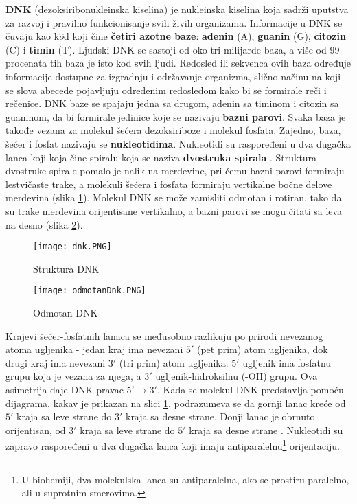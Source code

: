 \documentclass[12pt,oneside]{memoir}
\begin{document}
\textbf{DNK} (dezoksiribonukleinska kiselina) je nukleinska kiselina koja sadrži uputstva za razvoj i pravilno funkcionisanje svih živih organizama. Informacije u DNK se čuvaju kao k$\hat{o}$d koji čine \textbf{četiri azotne baze}: \textbf{adenin} (A), \textbf{guanin} (G), \textbf{citozin} (C) i \textbf{timin} (T). Ljudski DNK se sastoji od oko tri milijarde baza, a više od 99 procenata tih baza je isto kod svih ljudi. Redosled ili sekvenca ovih baza određuje informacije dostupne za izgradnju i održavanje organizma, slično načinu na koji se slova abecede pojavljuju određenim redosledom kako bi se formirale reči i rečenice. DNK baze se spajaju jedna sa drugom, adenin sa timinom i citozin sa guaninom, da bi formirale jedinice koje se nazivaju \textbf{bazni parovi}. Svaka baza je takođe vezana za molekul šećera dezoksiriboze i molekul fosfata. Zajedno, baza, šećer i fosfat nazivaju se \textbf{nukleotidima}. Nukleotidi su raspoređeni u dva dugačka lanca koji koja čine spiralu koja se naziva \textbf{dvostruka spirala} \cite{DNA}. Struktura dvostruke spirale pomalo je nalik na merdevine, pri čemu bazni parovi formiraju lestvičaste trake, a molekuli šećera i fosfata formiraju vertikalne bočne delove merdevina (slika \ref{fig:00}). Molekul DNK se može zamisliti odmotan i rotiran, tako da su trake merdevina orijentisane vertikalno, a bazni parovi se mogu čitati sa leva na desno (slika \ref{fig:odmotanDnk}).

\begin{figure}[!ht]
  \centering
  \texttt{[image: dnk.PNG]}
  \caption{Struktura DNK \cite{DNA}}
  \label{fig:00}
\end{figure}

\begin{figure}[!ht]
  \centering
  \texttt{[image: odmotanDnk.PNG]}
  \caption{Odmotan DNK \cite{DNA2}}
  \label{fig:odmotanDnk}
\end{figure}

Krajevi šećer-fosfatnih lanaca se međusobno razlikuju po prirodi nevezanog atoma ugljenika - jedan kraj ima nevezani $5'$ (pet prim) atom ugljenika, dok drugi kraj ima nevezani $3'$ (tri prim) atom ugljenika. $5'$ ugljenik ima fosfatnu grupu koja je vezana za njega, a $3'$ ugljenik-hidroksilnu (-OH) grupu. Ova asimetrija daje DNK pravac $5' \rightarrow 3'$. Kada se molekul DNK predstavlja pomoću dijagrama, kakav je prikazan na slici \ref{fig:00}, podrazumeva se da gornji lanac kreće od $5'$ kraja sa leve strane do $3'$ kraja sa desne strane. Donji lanac je obrnuto orijentisan, od $3'$ kraja sa leve strane do $5'$ kraja sa desne strane \cite{DNA2}. Nukleotidi su zapravo raspoređeni u dva dugačka lanca koji imaju antiparalelnu\footnote{U biohemiji, dva molekulska lanca su antiparalelna, ako se prostiru paralelno, ali u suprotnim smerovima.} orijentaciju. 
\end{document}
